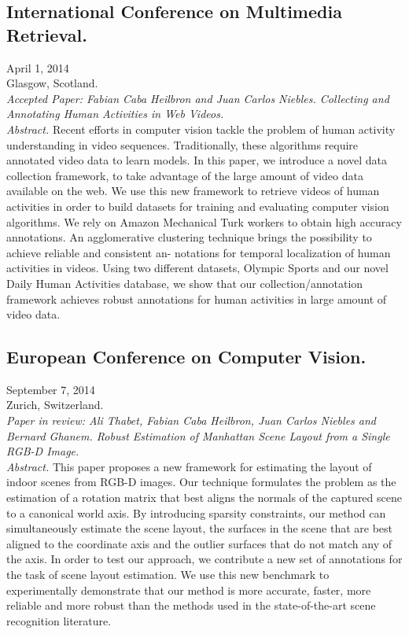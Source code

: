 \documentclass[letterpaper,10pt]{article}
\begin{document}
\subsection{International Conference on Multimedia Retrieval.} \hfill April 1, 2014 \\ 
Glasgow, Scotland. \\
\emph{Accepted Paper: Fabian Caba Heilbron and Juan Carlos Niebles. Collecting and Annotating Human Activities in Web Videos.}
\\ \emph{Abstract.} Recent efforts in computer vision tackle the problem of human activity understanding in video sequences. Traditionally, these algorithms require annotated video data to learn models. In this paper, we introduce a novel data collection framework, to take advantage of the large amount of video data available on the web. We use this new framework to retrieve videos of human activities in order to build datasets for training and evaluating computer vision algorithms. We rely on Amazon Mechanical Turk workers to obtain high accuracy annotations. An agglomerative clustering technique brings the possibility to achieve reliable and consistent an- notations for temporal localization of human activities in videos. Using two different datasets, Olympic Sports and our novel Daily Human Activities database, we show that our collection/annotation framework achieves robust annotations for human activities in large amount of video data.

\subsection{European Conference on Computer Vision.} \hfill September 7, 2014 \\ 
Zurich, Switzerland. \\
\emph{Paper in review: Ali Thabet, Fabian Caba Heilbron, Juan Carlos Niebles and Bernard Ghanem. Robust Estimation of Manhattan Scene Layout from a Single RGB-D Image.}
\\ \emph{Abstract.} This paper proposes a new framework for estimating the layout of indoor scenes from RGB-D images. Our technique formulates the problem as the estimation of a rotation matrix that best aligns the normals of the captured scene to a canonical world axis. 
By introducing sparsity constraints, our method can simultaneously estimate the scene layout, the surfaces in the scene that are 
best aligned to the coordinate axis and the outlier surfaces that do not match any of the axis. In order to test our approach, we contribute a new set of annotations for the task of scene layout estimation. We use this new benchmark to experimentally demonstrate that our method is more accurate, faster, more reliable and more robust than the methods used in the state-of-the-art scene recognition literature. 
\end{document}
